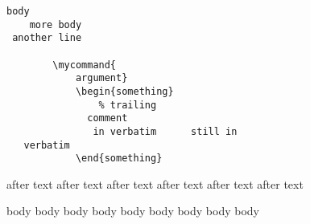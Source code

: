 \begin{verbatim}
body
    more body
 another line

        \mycommand{
            argument}
            \begin{something}
                % trailing
              comment
               in verbatim      still in 
   verbatim
            \end{something}
    \end{verbatim}

    after text after text 
    after text after text 
    after text after text 
    \begin{not}
      body body body
      body body body
      body body body
    \end{not}
